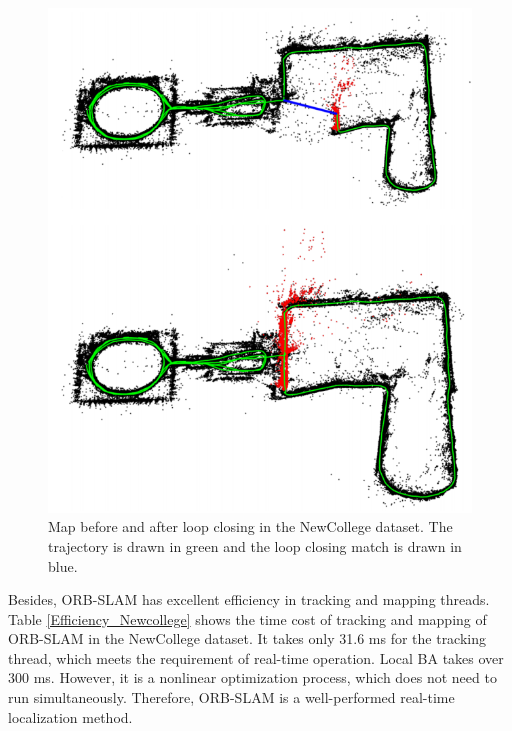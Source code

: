 \documentclass[letterpaper, 10 pt, conference]{ieeeconf}  %
\begin{document}
%
\begin{figure}[!htbp]%
\centering
\includegraphics[scale=0.37]{./images/NewCollege}
\caption{Map before and after loop closing in the NewCollege dataset. The trajectory is drawn in green and the loop closing match is drawn in blue.}
\label{new_college}
\end{figure}
%
Besides, ORB-SLAM has excellent efficiency in tracking and mapping threads. Table \ref{Efficiency_Newcollege} shows the time cost of tracking and mapping of ORB-SLAM in the NewCollege dataset. It takes only 31.6 ms for the tracking thread, which meets the requirement of real-time operation. Local BA takes over 300 ms. However, it is a nonlinear optimization process, which does not need to run simultaneously. Therefore, ORB-SLAM is a well-performed real-time localization method.
%
\end{document}
